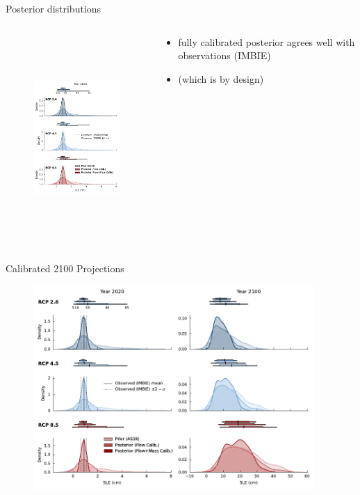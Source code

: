 \documentclass[aspectratio=169,hide notes,intlimits]{beamer}
\begin{document}
\begin{frame}{Posterior distributions}
  \begin{columns}[c]
    \begin{column}{.5\textwidth}
      \begin{figure}
        \includegraphics[height=7.75cm]{sle_pdf_w_obs_calibrated_2020.pdf}
      \end{figure}
    \end{column}
    \begin{column}{.5\textwidth}
      \begin{itemize}
      \item fully calibrated posterior agrees well with observations (IMBIE)
      \item (which is by design)
      \end{itemize}
    \end{column}
  \end{columns}
\end{frame}



\begin{frame}{Calibrated 2100 Projections}
    \begin{figure}
      \includegraphics[height=7.75cm]{sle_pdf_w_obs_2020_2100}
    \end{figure}
\end{frame}
\end{document}
